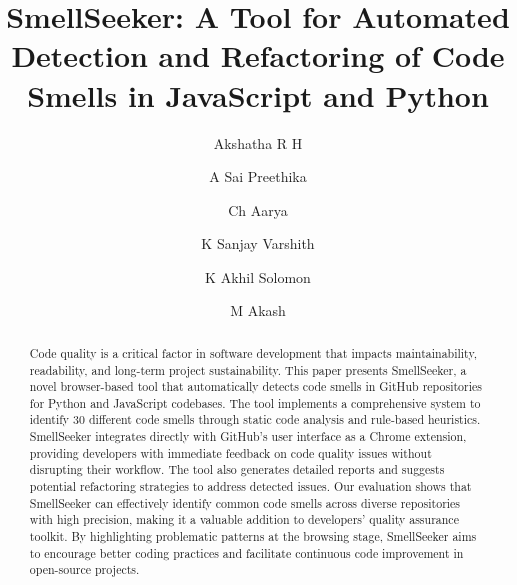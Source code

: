 \documentclass[sigconf,screen]{acmart}
\begin{document}
\title{SmellSeeker: A Tool for Automated Detection and Refactoring of Code Smells in JavaScript and Python}

\author{Akshatha R H}

\author{A Sai Preethika}

\author{Ch Aarya}

\author{K Sanjay Varshith}

\author{K Akhil Solomon}

\author{M Akash}


\renewcommand{\shortauthors}{Ch Aarya, et al.}

\begin{abstract}
  Code quality is a critical factor in software development that impacts maintainability, readability, and long-term project sustainability. This paper presents SmellSeeker, a novel browser-based tool that automatically detects code smells in GitHub repositories for Python and JavaScript codebases. The tool implements a comprehensive system to identify 30 different code smells through static code analysis and rule-based heuristics. SmellSeeker integrates directly with GitHub's user interface as a Chrome extension, providing developers with immediate feedback on code quality issues without disrupting their workflow. The tool also generates detailed reports and suggests potential refactoring strategies to address detected issues. Our evaluation shows that SmellSeeker can effectively identify common code smells across diverse repositories with high precision, making it a valuable addition to developers' quality assurance toolkit. By highlighting problematic patterns at the browsing stage, SmellSeeker aims to encourage better coding practices and facilitate continuous code improvement in open-source projects.
\end{abstract}
\end{document}
